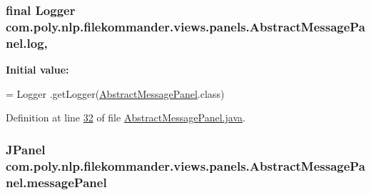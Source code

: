 \hypertarget{classcom_1_1poly_1_1nlp_1_1filekommander_1_1views_1_1panels_1_1_abstract_message_panel_a8f8836218e523baaab4c65c0bc9b1f7e}{
\subsubsection[{log}]{\setlength{\rightskip}{0pt plus 5cm}final Logger com.\-poly.\-nlp.\-filekommander.\-views.\-panels.\-Abstract\-Message\-Panel.\-log\hspace{0.3cm}{\ttfamily [static]}, {\ttfamily [private]}}}\label{classcom_1_1poly_1_1nlp_1_1filekommander_1_1views_1_1panels_1_1_abstract_message_panel_a8f8836218e523baaab4c65c0bc9b1f7e}
{\bfseries Initial value\-:}
\begin{DoxyCode}
= Logger
            .getLogger(\hyperlink{classcom_1_1poly_1_1nlp_1_1filekommander_1_1views_1_1panels_1_1_abstract_message_panel_a3d34321337c68753d8ca1c3cfb4cb37b}{AbstractMessagePanel}.class)
\end{DoxyCode}


Definition at line \hyperlink{L32}{32} of file \hyperlink{}{Abstract\-Message\-Panel.\-java}.

\hypertarget{classcom_1_1poly_1_1nlp_1_1filekommander_1_1views_1_1panels_1_1_abstract_message_panel_a5f778cbc2ed9dd8c37928dbe1412a0b0}{
\subsubsection[{message\-Panel}]{\setlength{\rightskip}{0pt plus 5cm}J\-Panel com.\-poly.\-nlp.\-filekommander.\-views.\-panels.\-Abstract\-Message\-Panel.\-message\-Panel\hspace{0.3cm}{\ttfamily [private]}}}\label{classcom_1_1poly_1_1nlp_1_1filekommander_1_1views_1_1panels_1_1_abstract_message_panel_a5f778cbc2ed9dd8c37928dbe1412a0b0}


